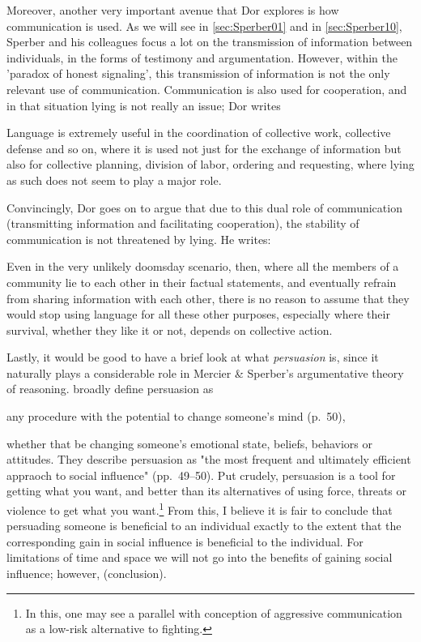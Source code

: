 Moreover, another very important avenue that Dor explores is how communication is used. As we will see in \cref{sec:Sperber01} and in \cref{sec:Sperber10}, Sperber and his colleagues focus a lot on the transmission of information between individuals, in the forms of testimony and argumentation. However, within the 'paradox of honest signaling', this transmission of information is not the only relevant use of communication. Communication is also used for cooperation, and in that situation lying is not really an issue; Dor writes
\begin{quoting}
    Language is extremely useful in the coordination of collective work, collective defense and so on, where it is used not just for the exchange of information but also for collective planning, division of labor, ordering and requesting, where lying as such does not seem to play a major role.
    \hfill \citep[p.~51]{Dor17}
\end{quoting}
Convincingly, Dor goes on to argue that due to this dual role of communication (transmitting information and facilitating cooperation), the stability of communication is not threatened by lying. He writes:
\begin{quoting}
    Even in the very unlikely doomsday scenario, then, where all the members of a community lie to each other in their factual statements, and eventually refrain from sharing information with each other, there is no reason to assume that they would stop using language for all these other purposes, especially where their survival, whether they like it or not, depends on collective action.
    \hfill \citep[p.~52]{Dor17}
\end{quoting}

Lastly, it would be good to have a brief look at what \emph{persuasion} is, since it naturally plays a considerable role in Mercier \& Sperber's argumentative theory of reasoning.
\citet{Brinol09} broadly define persuasion as
\begin{quoting}
    any procedure with the potential to change someone's mind
    \hfill (p.~50),
\end{quoting}
whether that be changing someone's emotional state, beliefs, behaviors or attitudes.
They describe persuasion as "the most frequent and ultimately efficient appraoch to social influence" (pp.~49--50). Put crudely, persuasion is a tool for getting what you want, and better than its alternatives of using force, threats or violence to get what you want.\footnote{In this, one may see a parallel with  conception of aggressive communication as a low-risk alternative to fighting.}
From this, I believe it is fair to conclude that persuading someone is beneficial to an individual exactly to the extent that the corresponding gain in social influence is beneficial to the individual.
For limitations of time and space we will not go into the benefits of gaining social influence; however, (conclusion).

